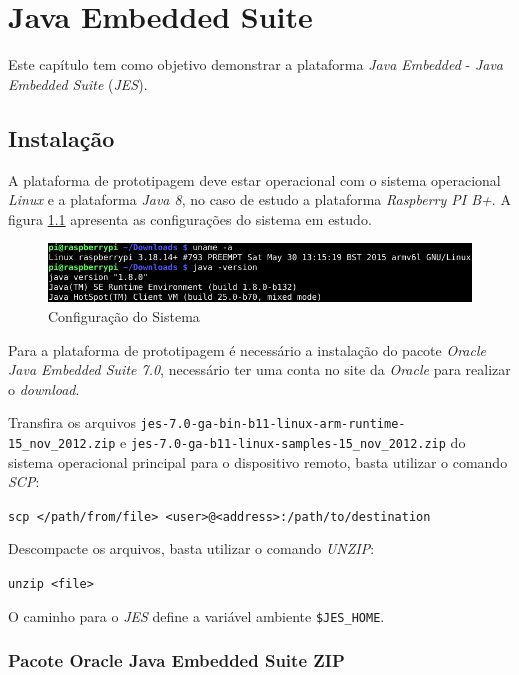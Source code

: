 %

\chapter{Java Embedded Suite}

Este capítulo tem como objetivo demonstrar a plataforma \textit{Java Embedded} 
- \textit{Java Embedded Suite} (\textit{JES}).

\section{Instalação}

A plataforma de prototipagem deve estar operacional com o sistema operacional 
\textit{Linux} e a plataforma \textit{Java 8}, no caso de estudo a plataforma 
\textit{Raspberry PI B+}. A figura \ref{fig:jes/configuracao} apresenta as 
configurações do sistema em estudo.

\begin{figure}[H]
    \centering
    \includegraphics[width=0.7\linewidth]{figuras/java/configuracao}
    \caption{Configuração do Sistema}
    \label{fig:jes/configuracao}
\end{figure}

Para a plataforma de prototipagem é necessário a instalação do pacote 
\textit{Oracle Java Embedded Suite 7.0}, necessário ter uma conta no site da 
\textit{Oracle} para realizar o \textit{download}.

Transfira os arquivos \newline
\verb|jes-7.0-ga-bin-b11-linux-arm-runtime-15_nov_2012.zip|
 e \newline
\verb|jes-7.0-ga-b11-linux-samples-15_nov_2012.zip|
 do sistema operacional principal para o dispositivo remoto, basta 
utilizar o comando 
\textit{SCP}:

\verb|scp </path/from/file> <user>@<address>:/path/to/destination|

Descompacte os arquivos, basta utilizar o comando \textit{UNZIP}:

\verb|unzip <file>|

O caminho para o \textit{JES} define a variável ambiente \verb|$JES_HOME|.

\subsection{Pacote Oracle Java Embedded Suite ZIP}

